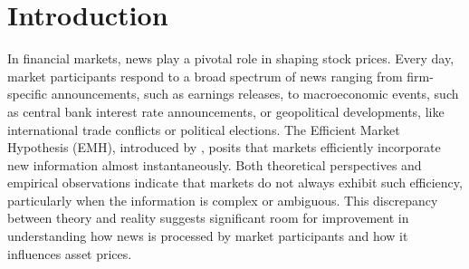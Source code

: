 \section{Introduction}
\hspace{0.5cm} In financial markets, news play a pivotal role in shaping stock prices. Every day, market participants respond to a broad spectrum of news ranging from firm-specific announcements, such as earnings releases, to macroeconomic events, such as central bank interest rate announcements, or geopolitical developments, like international trade conflicts or political elections. The Efficient Market Hypothesis (EMH), introduced by \cite{fama1970efficient}, posits that markets efficiently incorporate new information almost instantaneously. Both theoretical perspectives and empirical observations indicate that markets do not always exhibit such efficiency, particularly when the information is complex or ambiguous. This discrepancy between theory and reality suggests significant room for improvement in understanding how news is processed by market participants and how it influences asset prices.


